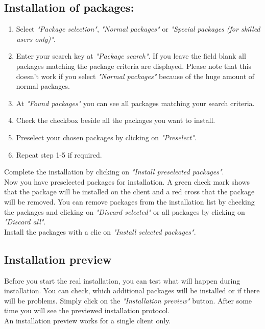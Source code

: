 \subsection{Installation of packages:}
\begin{enumerate}
\item  Select \textit{"Package selection"}, \textit{"Normal packages"} or \textit{"Special packages (for skilled users only)"}.\\
\item  Enter your search key at \textit{"Package search"}. If you leave the field blank all packages matching the package criteria are displayed. Please note that this doesn't work if you select \textit{"Normal packages"} because of the huge amount of normal packages.\\
\item  At \textit{"Found packages"} you can see all packages matching your search criteria.\\
\item  Check the checkbox beside all the packages you want to install.\\
\item  Preselect your chosen packages by clicking on \textit{"Preselect"}.\\
\item  Repeat step 1-5 if required.\\
\end{enumerate}
Complete the installation by clicking on \textit{"Install preselected packages"}.\\
Now you have preselected packages for installation. A green check mark shows that the package will be installed on the client and a red cross that the package will be removed. You can remove packages from the installation list by checking the packages and clicking on \textit{"Discard selected"} or all packages by clicking on \textit{"Discard all"}.\\
Install the packages with a clic on \textit{"Install selected packages"}.\\
\subsection{Installation preview}
Before you start the real installation, you can test what will happen during installation. You can check, which additional packages will be installed or if there will be problems. Simply click on the \textit{"Installation preview"} button. After some time you will see the previewed installation protocol.\\
An installation preview works for a single client only.\\
